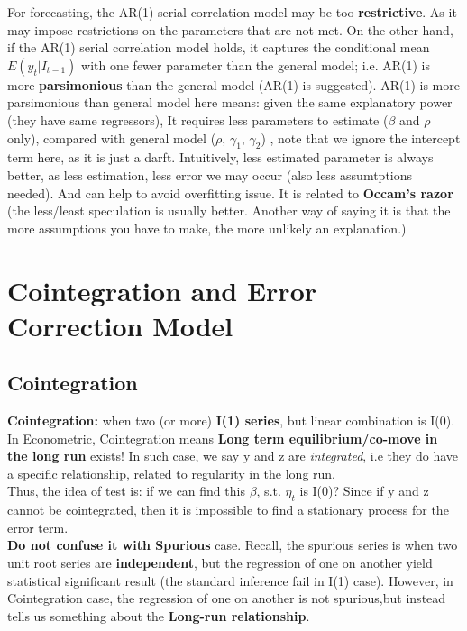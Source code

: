 \documentclass[12pt]{article}
\begin{document}
For forecasting, the AR(1) serial correlation model may be too \textbf{restrictive}. As it may impose restrictions on the parameters that are not met. On the other hand, if the AR(1) serial correlation model holds, it captures the conditional mean $E(y_t|I_{t-1})$ with one fewer parameter than the general model; i.e. AR(1) is more \textbf{parsimonious} than the general model (AR(1) is suggested). AR(1) is more parsimonious than general model here means: given the same explanatory power (they have same regressors), It requires less parameters to estimate ($\beta$ and $\rho$ only), compared with general model ($\rho$, $\gamma_1$, $\gamma_2$) , note that we ignore the intercept term here, as it is just a darft. Intuitively, less estimated parameter is always better, as less estimation, less error we may occur (also less assumtptions needed). And can help to avoid overfitting issue.  It is related to \textbf{Occam's razor} (the less/least speculation is usually better. Another way of saying it is that the more assumptions you have to make, the more unlikely an explanation.)
\\



\newpage
{\color{RoyalBlue}
\section{Cointegration and Error Correction Model}}

{\color{RoyalBlue}
\subsection{Cointegration}}

\noindent
\textbf{Cointegration: } when two (or more) \textbf{I(1) series}, but linear combination is I(0). In Econometric, Cointegration means \textbf{Long term equilibrium/co-move in the long run} exists! In such case, we say y and z are \textit{integrated}, i.e they do have a specific relationship, related to regularity in the long run. 
\\

Thus, the idea of test is: if we can find this $\beta$, s.t. $\eta_{t}$ is I(0)? Since if y and z cannot be cointegrated, then it is impossible to find a stationary process for the error term. 
\\

\textbf{Do not confuse it with Spurious} case. Recall, the spurious series is when two unit root series are \textbf{independent}, but the regression of one on another yield statistical significant result (the standard inference fail in I(1) case). However, in Cointegration case, the regression of one on another is not spurious,but instead tells us something about the \textbf{Long-run relationship}. 
\\
\end{document}

